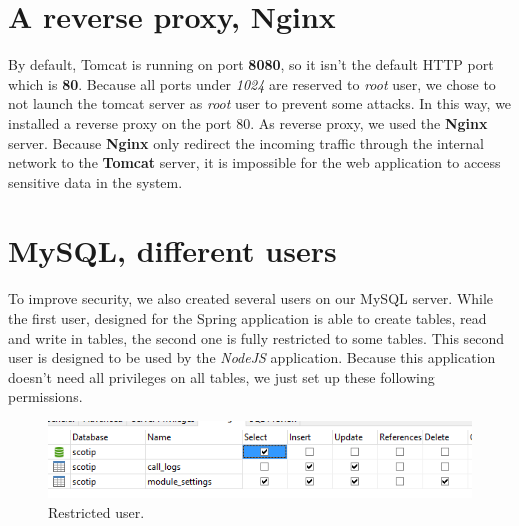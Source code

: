\section{A reverse proxy, Nginx}

By default, Tomcat is running on port \textbf{8080}, so it isn't the default HTTP port which is \textbf{80}. Because all ports under \textit{1024} are reserved to \textit{root} user, we chose to not launch the tomcat server as \textit{root} user to prevent some attacks. In this way, we installed a reverse proxy on the port 80. As reverse proxy, we used the \textbf{Nginx} server.
Because \textbf{Nginx} only redirect the incoming traffic through the internal network to the \textbf{Tomcat} server, it is impossible for the web application to access sensitive data in the system.

\section{MySQL, different users}
To improve security, we also created several users on our MySQL server. While the first user, designed for the Spring application is able to create tables, read and write in tables, the second one is fully restricted to some tables. This second user is designed to be used by the \textit{NodeJS} application. Because this application doesn't need all privileges on all tables, we just set up these following permissions. 

\begin{figure}[H]
  \caption{Restricted user.}
  \centering
    \includegraphics[width=1\textwidth]{img/scotipnodespas.png}
\end{figure}

